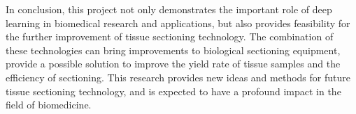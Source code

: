 In conclusion, this project not only demonstrates the important role of deep learning in biomedical research and applications, but also provides feasibility for the further improvement of tissue sectioning technology. The combination of these technologies can bring improvements to biological sectioning equipment, provide a possible solution to improve the yield rate of tissue samples and the efficiency of sectioning. This research provides new ideas and methods for future tissue sectioning technology, and is expected to have a profound impact in the field of biomedicine.


\FloatBarrier %